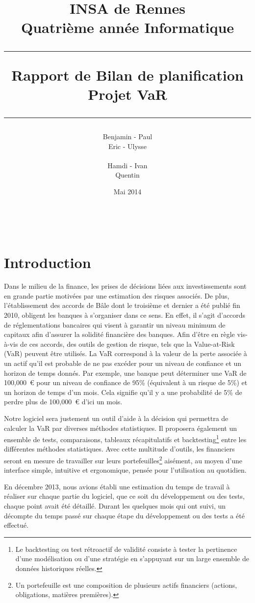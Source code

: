 \documentclass[a4paper]{report}
\title{INSA de Rennes \\ Quatrième année Informatique \\ \bigskip \hrule \bigskip Rapport de Bilan de planification \\ \bigskip Projet VaR \bigskip \hrule}
\author{Benjamin \bsc{Bouguet} - Paul \bsc{Chaignon} \\Eric \bsc{Chauty} - Ulysse \bsc{Goarant} \\ ~~\\
Hamdi \bsc{Raissi} - Ivan \bsc{Le Plumey} \\ Quentin \bsc{Giai Gianetto}}
\date{Mai 2014}
\begin{document}
\maketitle

\thispagestyle{empty}
\newpage

~~
\thispagestyle{empty}
\newpage


\tableofcontents
\newpage


\chapter{Introduction}
Dans le milieu de la finance, les prises de décisions liées aux investissements sont en grande partie motivées par une estimation des risques associés.
De plus, l'établissement des accords de Bâle dont le troisième et dernier a été publié fin 2010, obligent les banques à s'organiser dans ce sens.
En effet, il s'agit d'accords de réglementations bancaires qui visent à garantir un niveau minimum de capitaux afin d'assurer la solidité financière des banques.
Afin d'être en règle vis-à-vis de ces accords, des outils de gestion de risque, tels que la Value-at-Risk (VaR) peuvent être utilisés.
La VaR correspond à la valeur de la perte associée à un actif qu'il est probable de ne pas excéder pour un niveau de confiance et un horizon de temps donnés.
Par exemple, une banque peut déterminer une VaR de 100,000~€ pour un niveau de confiance de 95\% (équivalent à un risque de 5\%) et un horizon de temps d'un mois.
Cela signifie qu'il y a une probabilité de 5\% de perdre plus de 100,000~€ d'ici un mois.

Notre logiciel sera justement un outil d'aide à la décision qui permettra de calculer la VaR  par diverses méthodes statistiques.
Il proposera également un ensemble de tests, comparaisons, tableaux récapitulatifs et backtesting\footnote{Le backtesting ou test rétroactif de validité consiste à tester la pertinence d'une modélisation ou d'une stratégie en s'appuyant sur un large ensemble de données historiques réelles.} entre les différentes méthodes statistiques.
Avec cette multitude d'outils, les financiers seront en mesure de travailler sur leurs portefeuilles\footnote{Un portefeuille est une composition de plusieurs actifs financiers (actions, obligations, matières premières).} aisément, au moyen d’une interface simple, intuitive et ergonomique, pensée pour l'utilisation au quotidien.

En décembre 2013, nous avions établi une estimation du temps de travail à réaliser sur chaque partie du logiciel, que ce soit du développement ou des tests, chaque point avait été détaillé.
Durant les quelques mois qui ont suivi, un décompte du temps passé sur chaque étape du développement ou des tests a été effectué.
\end{document}

